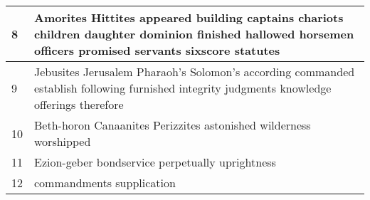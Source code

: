 \begin{center}
\begin{longtable}{p{0.4in}|p{3.6in}}
8 & Amorites Hittites appeared building captains chariots children daughter dominion finished hallowed horsemen officers promised servants sixscore statutes \\ \hline
9 & Jebusites Jerusalem Pharaoh's Solomon's according commanded establish following furnished integrity judgments knowledge offerings therefore \\ \hline
10 & Beth-horon Canaanites Perizzites astonished wilderness worshipped \\ \hline
11 & Ezion-geber bondservice perpetually uprightness \\ \hline
12 & commandments supplication \\ \hline



\end{longtable}
\end{center}
 
